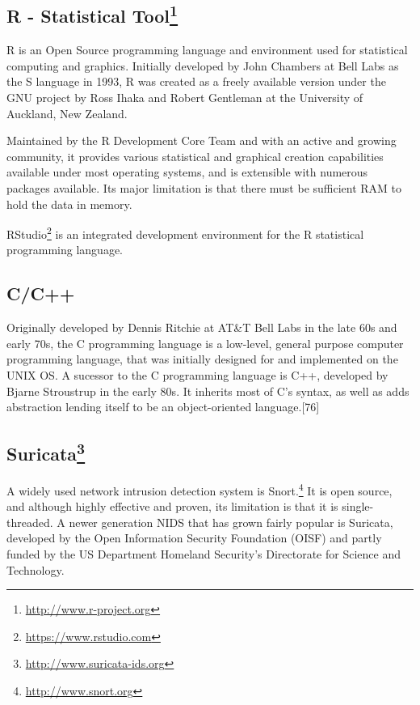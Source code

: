 \documentclass[11pt,]{article}
\begin{document}
\subsection*{R - Statistical Tool\footnote{\url{http://www.r-project.org}}}\label{r---statistical-tool8}

R is an Open Source programming language and environment used for
statistical computing and graphics. Initially developed by John Chambers
at Bell Labs as the S language in 1993, R was created as a freely
available version under the GNU project by Ross Ihaka and Robert
Gentleman at the University of Auckland, New Zealand.

Maintained by the R Development Core Team and with an active and growing
community, it provides various statistical and graphical creation
capabilities available under most operating systems, and is extensible
with numerous packages available. Its major limitation is that there
must be sufficient RAM to hold the data in memory.

RStudio\footnote{\url{https://www.rstudio.com}} is an integrated
development environment for the R statistical programming language.

\subsection*{C/C++}\label{cc}

Originally developed by Dennis Ritchie at AT\&T Bell Labs in the late
60s and early 70s, the C programming language is a low-level, general
purpose computer programming language, that was initially designed for
and implemented on the UNIX OS. A sucessor to the C programming language
is C++, developed by Bjarne Stroustrup in the early 80s. It inherits
most of C's syntax, as well as adds abstraction lending itself to be an
object-oriented language.{[}76{]}

\subsection*{Suricata\footnote{\url{http://www.suricata-ids.org}}}\label{suricata10}

A widely used network intrusion detection system is Snort.\footnote{\url{http://www.snort.org}}
It is open source, and although highly effective and proven, its
limitation is that it is single-threaded. A newer generation NIDS that
has grown fairly popular is Suricata, developed by the Open Information
Security Foundation (OISF) and partly funded by the US Department
Homeland Security's Directorate for Science and Technology.
\end{document}
